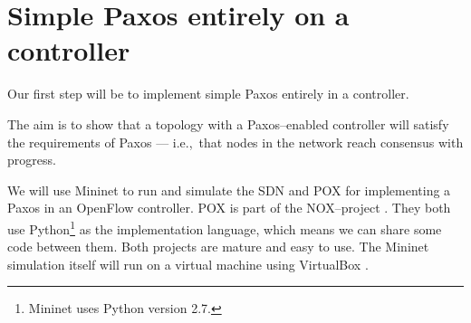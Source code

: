 \chapter{Simple Paxos entirely on a controller}

Our first step will be to implement simple Paxos \cite{Lam01} entirely in a
controller.

The aim is to show that a topology with a Paxos--enabled controller will
satisfy the requirements of Paxos --- i.e.,~that nodes in the network reach
consensus with progress.

We will use Mininet \cite{Lantz:2010:NLR:1868447.1868466} to
run and simulate the \ac{SDN} and POX \cite{POX.1} for
implementing a Paxos in an OpenFlow controller.  POX is part of the
NOX--project \cite{Gude:2008:NTO:1384609.1384625}.  They both use
Python\footnote{Mininet uses Python version 2.7.}
\cite{vanRossum:2009:PRM:1610526} as the implementation language, which
means we can share some code between them.  Both projects are mature and
easy to use.  The Mininet simulation itself will run on a virtual machine
using VirtualBox \cite{Watson:2008:VBB:1344209.1344210}.
